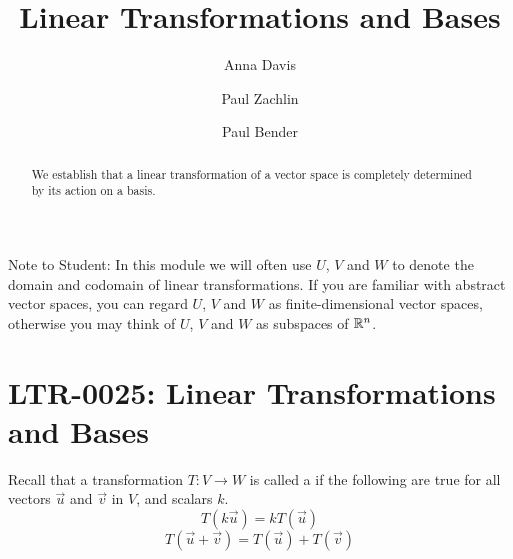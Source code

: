 \documentclass{ximera}
\author{Anna Davis \and Paul Zachlin \and Paul Bender} \title{Linear Transformations and Bases} \license{CC-BY 4.0}
\begin{document}
\begin{abstract}
We establish that a linear transformation of a vector space is completely determined by its action on a basis. 
\end{abstract}
\maketitle

Note to Student:  In this module we will often use $U$, $V$ and $W$ to denote the domain and codomain of linear transformations.  If you are familiar with abstract vector spaces, you can regard $U$, $V$ and $W$ as finite-dimensional vector spaces, otherwise you may think of $U$, $V$ and $W$ as subspaces of $\mathbb{R}^n$.

\section*{LTR-0025: Linear Transformations and Bases}

Recall that a transformation $T:V\rightarrow W$ is called a  if the following are true for all vectors $\vec{u}$ and $\vec{v}$ in $V$, and scalars $k$.
\begin{equation*}
T(k\vec{u})= kT(\vec{u})
\end{equation*}
\begin{equation*}
T(\vec{u}+\vec{v})= T(\vec{u})+T(\vec{v})
\end{equation*}
\end{document}
